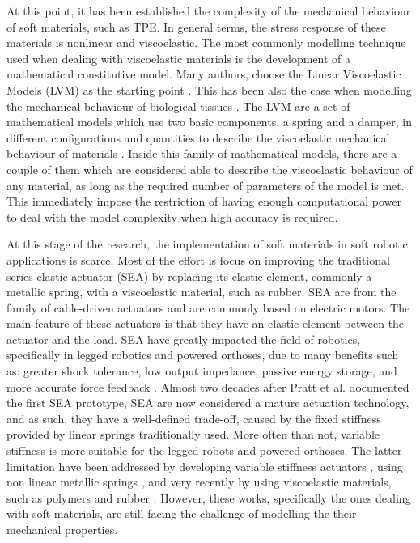 At this point, it has been established the complexity of the mechanical behaviour of soft materials, such as TPE. In general terms, the stress response of these materials is nonlinear and viscoelastic. The most commonly modelling technique used when dealing with viscoelastic materials is the development of a mathematical constitutive model. Many authors, choose the Linear Viscoelastic Models (LVM) as the starting point \cite{xu2014mathematical,tirella2014strain,lu2017constitutive,ciniello2017identifying}. This has been also the case when modelling the mechanical behaviour of biological tissues \cite{sanjeevi1982viscoelastic}. The LVM are a set of mathematical models which use two basic components, a spring and a damper, in different configurations and quantities to describe the viscoelastic mechanical behaviour of materials \cite{roylance2001engineering}. Inside this family of mathematical models, there are a couple of them which are considered able to describe the viscoelastic behaviour of any material, as long as the required number of parameters of the model is met. This immediately impose the restriction of having enough computational power to deal with the model complexity when high accuracy is required.

At this stage of the research, the implementation of soft materials in soft robotic applications is scarce. Most of the effort is focus on improving the traditional series-elastic actuator (SEA) by replacing its elastic element, commonly a metallic spring, with a viscoelastic material, such as rubber. SEA are from the family of cable-driven actuators and are commonly based on electric motors. The main feature of these actuators is that they have an elastic element between the actuator and the load. SEA have greatly impacted the field of robotics, specifically in legged robotics and powered orthoses, due to many benefits such as: greater shock tolerance, low output impedance, passive energy storage, and more accurate force feedback \cite{pratt1995series,pratt2004series,au2008powered}. Almost two decades after Pratt et al. documented the first SEA prototype, SEA are now considered a mature actuation technology, and as such, they have a well-defined trade-off, caused by the fixed stiffness provided by linear springs traditionally used. More often than not, variable stiffness is more suitable for the legged robots and powered orthoses. The latter limitation have been addressed by developing variable stiffness actuators \cite{groothuis2012vsaut}, using non linear metallic springs \cite{migliore2007novel}, and very recently by using viscoelastic materials, such as polymers and rubber \cite{rollinson2013design,parietti2011series,schepelmann2014compact}. However, these works, specifically the ones dealing with soft materials, are still facing the challenge of modelling the their mechanical properties. 


